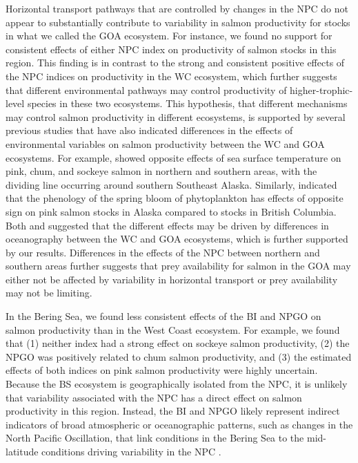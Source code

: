 Horizontal transport pathways that are controlled by changes in the NPC do not
appear to substantially contribute to variability in salmon productivity for
stocks in what we called the GOA ecosystem. For instance, we found no support
for consistent effects of either NPC index on productivity of salmon stocks in
this region. This finding is in contrast to the strong and consistent positive
effects of the NPC indices on productivity in the WC ecosystem, which further
suggests that different environmental pathways may control productivity of
higher-trophic-level species in these two ecosystems. This hypothesis, that
different mechanisms may control salmon productivity in different ecosystems, is
supported by several previous studies that have also indicated differences in
the effects of environmental variables on salmon productivity between the WC and
GOA ecosystems. For example, \citet{Mueter2002a} showed opposite effects of sea
surface temperature on pink, chum, and sockeye salmon in northern and southern
areas, with the dividing line occurring around southern Southeast Alaska.
Similarly, \citet{Malick2015a} indicated that the phenology of the spring bloom
of phytoplankton has effects of opposite sign on pink salmon stocks in Alaska
compared to stocks in British Columbia. Both \citet{Mueter2002a} and
\citet{Malick2015a} suggested that the different effects may be driven by
differences in oceanography between the WC and GOA ecosystems, which is further
supported by our results. Differences in the effects of the NPC between northern
and southern areas further suggests that prey availability for salmon in the GOA
may either not be affected by variability in horizontal transport or prey
availability may not be limiting.

In the Bering Sea, we found less consistent effects of the BI and NPGO on salmon
productivity than in the West Coast ecosystem. For example, we found that (1)
neither index had a strong effect on sockeye salmon productivity, (2) the NPGO
was positively related to chum salmon productivity, and (3) the estimated
effects of both indices on pink salmon productivity were highly uncertain.
Because the BS ecosystem is geographically isolated from the NPC, it is unlikely
that variability associated with the NPC has a direct effect on salmon
productivity in this region. Instead, the BI and NPGO likely represent indirect
indicators of broad atmospheric or oceanographic patterns, such as changes in
the North Pacific Oscillation, that link conditions in the Bering Sea to the
mid-latitude conditions driving variability in the NPC \citep{DiLorenzo2013a}.

